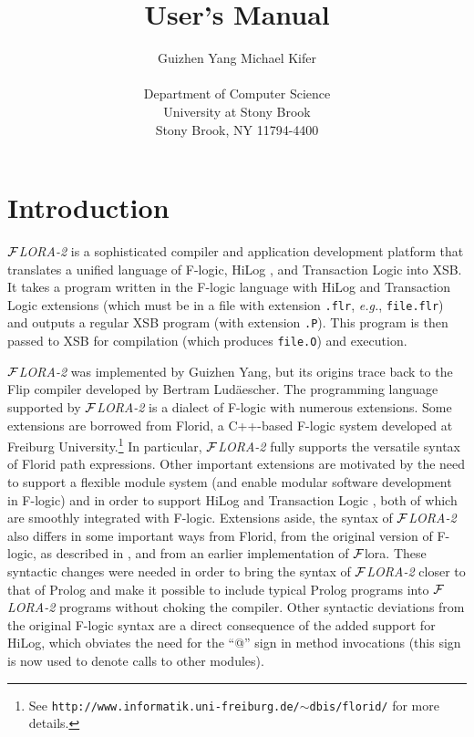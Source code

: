 \documentclass[11pt]{article}
\title{\FLORA User's Manual}
\author{
  {Guizhen Yang
  \hspace{3cm}
  Michael Kifer}
  \\\\
  Department of Computer Science\\
  University at Stony Brook\\
  Stony Brook, NY 11794-4400
  }
\newcommand{\FLIP}{{\mbox{\sc Flip}}\xspace}
\newcommand{\FLORA}{{\mbox{${\cal F}${\small\it LORA}\rm\emph{-2}}}\xspace}
\newcommand{\FLORAone}{{\mbox{${\cal F}${\sc lora}}}\xspace}
\newcommand{\FLORID}{{\mbox{\sc Florid}}\xspace}
\newcommand{\fl}{\mbox{F-logic}\xspace}
\begin{document}
\maketitle
\thispagestyle{empty}

\newpage
{}
\setcounter{page}{1}

\tableofcontents

\newpage

\setcounter{page}{1}


\section{Introduction}

\FLORA is a sophisticated compiler and application development platform
that translates a unified language of \fl \cite{KLW95}, HiLog
\cite{hilog-jlp}, and Transaction Logic \cite{trans-tcs94} into XSB. It
takes a program written in the \fl language with HiLog and Transaction
Logic extensions (which must be in a file with extension {\tt .flr}, {\it
  e.g.}, {\tt file.flr}) and outputs a regular XSB program (with extension
{\tt .P}).  This program is then passed to XSB for compilation (which
produces {\tt file.O}) and execution.

\FLORA was implemented by Guizhen Yang, but its origins trace back to the
\FLIP compiler developed by Bertram Lud\"aescher.  The programming language
supported by \FLORA is a dialect of \fl with numerous extensions.  Some
extensions are borrowed from \FLORID, a C++-based \fl system developed at
Freiburg University.\footnote{
  See {\tt http://www.informatik.uni-freiburg.de/$\sim$dbis/florid/} for more
  details.
  }
In particular, \FLORA fully supports the versatile syntax of \FLORID path
expressions. Other important extensions are motivated by the need to
support a flexible module system (and enable modular software development
in \fl) and in order to support HiLog \cite{hilog-jlp} and Transaction
Logic \cite{trans-dbpl93,trans-iclp93,trans-tcs94}, both of which are
smoothly integrated with \fl. Extensions aside, the syntax of \FLORA also
differs in some important ways from \FLORID, from the original version of
\fl, as described in \cite{KLW95}, and from an earlier implementation
of \FLORAone. These syntactic changes were needed in order to bring the
syntax of \FLORA closer to that of Prolog and make it possible to include
typical Prolog programs into \FLORA programs without choking the compiler.
Other syntactic deviations from the original F-logic syntax are a direct
consequence of the added support for HiLog, which obviates the need for the
``@'' sign in method invocations (this sign is now used to denote calls to
other modules).
\end{document}
